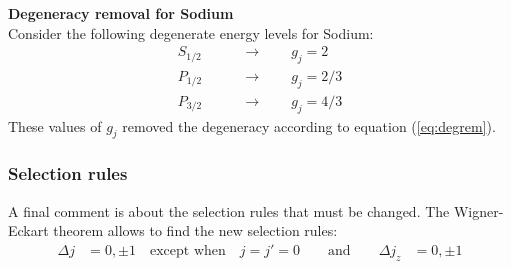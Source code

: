 \begin{tcolorbox} 
\textbf{Degeneracy removal for Sodium} \\
Consider the following degenerate energy levels for Sodium: 
\begin{align*}
    S_{1/2} \qquad &\longrightarrow \qquad g_j = 2 \\
    P_{1/2} \qquad &\longrightarrow \qquad g_j = 2/3 \\
    P_{3/2} \qquad &\longrightarrow \qquad g_j = 4/3
\end{align*}
These values of $g_j$ removed  the degeneracy according to equation (\ref{eq:degrem}). 
\begin{center}

\end{center}
\end{tcolorbox}

\subsubsection{Selection rules}

A final comment is about the selection rules that must be changed. The Wigner-Eckart theorem allows to find the new selection rules: 
\begin{align}
     \Delta j &= 0, \pm 1 \quad \text{except when}\quad j=j'=0 \qquad \text{and} \qquad \Delta j_z &= 0, \pm 1 
\end{align}

